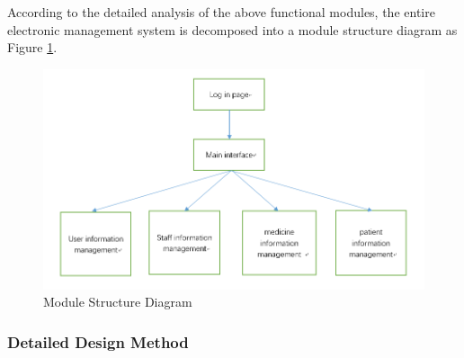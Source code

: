 According to the detailed analysis of the above functional modules, the entire electronic management system is decomposed into a module structure diagram as Figure \ref{fig:p1}.
\begin{figure}[H]
    \centering
    \includegraphics[width=\textwidth]{1.png}
    \caption{Module Structure Diagram }
    \label{fig:p1}
\end{figure}
\subsubsection{Detailed Design Method}

